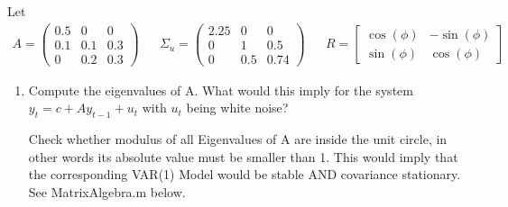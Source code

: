 Let
\begin{align*}
    A = \begin{pmatrix}0.5 &0 &0 \\0.1&0.1&0.3\\0&0.2&0.3 \end{pmatrix} &  & \Sigma_u = \begin{pmatrix}2.25 & 0 & 0\\ 0 & 1 & 0.5\\ 0 & 0.5 & 0.74 \end{pmatrix} &  & R = \begin{bmatrix} \cos(\phi) & -\sin(\phi)\\ \sin(\phi) & \cos(\phi) \end{bmatrix}
\end{align*}
\begin{enumerate}
    \item Compute the eigenvalues of A. What would this imply for the system $y_t = c + A y_{t-1} + u_t$ with $u_t$ being white noise?
          \begin{solution}
              Check whether modulus of all Eigenvalues of A are inside the unit circle, in other words its absolute value must be smaller than 1.
              This would imply that the corresponding VAR(1) Model would be stable AND covariance stationary. See MatrixAlgebra.m  below.
          \end{solution}


\end{enumerate}
